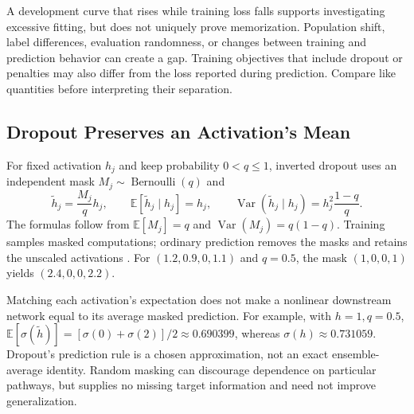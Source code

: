 A development curve that rises while training loss falls supports investigating excessive fitting, but does not uniquely prove memorization. Population shift, label differences, evaluation randomness, or changes between training and prediction behavior can create a gap. Training objectives that include dropout or penalties may also differ from the loss reported during prediction. Compare like quantities before interpreting their separation.

\subsection{Dropout Preserves an Activation's Mean}

For fixed activation $h_j$ and keep probability $0<q\leq1$, inverted dropout uses an independent mask $M_j\sim\operatorname{Bernoulli}(q)$ and
\[
\tilde h_j=\frac{M_j}{q}h_j,
\qquad
\mathbb E[\tilde h_j\mid h_j]=h_j,
\qquad
\operatorname{Var}(\tilde h_j\mid h_j)=h_j^2\frac{1-q}{q}.
\]
The formulas follow from $\mathbb E[M_j]=q$ and $\operatorname{Var}(M_j)=q(1-q)$. Training samples masked computations; ordinary prediction removes the masks and retains the unscaled activations \citep{srivastava2014dropout}. For $(1.2,0.9,0,1.1)$ and $q=0.5$, the mask $(1,0,0,1)$ yields $(2.4,0,0,2.2)$.

\par\addvspace{\intextsep}\noindent\begin{minipage}{\linewidth}
\centering
{}
\label{fig:regularization-toolbox}
\end{minipage}\par\addvspace{\intextsep}

Matching each activation's expectation does not make a nonlinear downstream network equal to its average masked prediction. For example, with $h=1,q=0.5$, $\mathbb E[\sigma(\tilde h)]=[\sigma(0)+\sigma(2)]/2\approx0.690399$, whereas $\sigma(h)\approx0.731059$. Dropout's prediction rule is a chosen approximation, not an exact ensemble-average identity. Random masking can discourage dependence on particular pathways, but supplies no missing target information and need not improve generalization.

